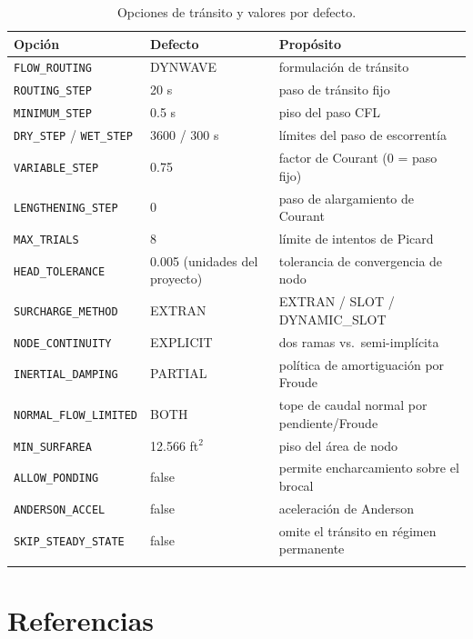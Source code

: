 \documentclass[11pt,a4paper]{article}
\begin{document}
\begin{longtable}{>{\raggedright}p{4.6cm}>{\raggedright}p{2.6cm}>{\raggedright\arraybackslash}p{7.0cm}}
\toprule
\textbf{Opción} & \textbf{Defecto} & \textbf{Propósito} \\
\midrule
\endhead
\texttt{FLOW\_ROUTING} & DYNWAVE & formulación de tránsito \\
\texttt{ROUTING\_STEP} & 20 s & paso de tránsito fijo \\
\texttt{MINIMUM\_STEP} & 0.5 s & piso del paso CFL \\
\texttt{DRY\_STEP} / \texttt{WET\_STEP} & 3600 / 300 s & límites del paso de escorrentía \\
\texttt{VARIABLE\_STEP} & 0.75 & factor de Courant (0 = paso fijo) \\
\texttt{LENGTHENING\_STEP} & 0 & paso de alargamiento de Courant \\
\texttt{MAX\_TRIALS} & 8 & límite de intentos de Picard \\
\texttt{HEAD\_TOLERANCE} & 0.005 (unidades del proyecto) & tolerancia de convergencia de nodo \\
\texttt{SURCHARGE\_METHOD} & EXTRAN & EXTRAN / SLOT / DYNAMIC\_SLOT \\
\texttt{NODE\_CONTINUITY} & EXPLICIT & dos ramas vs.\ semi-implícita \\
\texttt{INERTIAL\_DAMPING} & PARTIAL & política de amortiguación por Froude \\
\texttt{NORMAL\_FLOW\_LIMITED} & BOTH & tope de caudal normal por pendiente/Froude \\
\texttt{MIN\_SURFAREA} & 12.566 ft$^2$ & piso del área de nodo \\
\texttt{ALLOW\_PONDING} & false & permite encharcamiento sobre el brocal \\
\texttt{ANDERSON\_ACCEL} & false & aceleración de Anderson \\
\texttt{SKIP\_STEADY\_STATE} & false & omite el tránsito en régimen permanente \\
\bottomrule
\caption{Opciones de tránsito y valores por defecto.}
\label{tab:options}
\end{longtable}

\section{Referencias}
\end{document}
